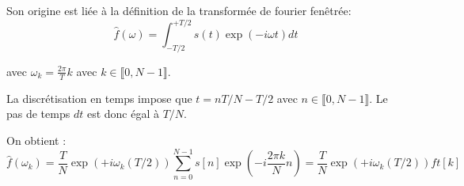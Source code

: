 \documentclass[a4paper, 12pt]{article}
\newcommand{\matlabscript}[2]
  {\begin{itemize}\item[]\end{itemize}}
\begin{document}
Son origine est liée à la définition de la transformée de fourier fenêtrée:
\begin{equation}
\hat{f}(\omega)=\int_{-T/2}^{+T/2} s(t) \exp \left(-i \omega t \right) dt
\end{equation}

avec $\omega_k=\frac{2 \pi}{T} k$ avec  $k \in  \llbracket  0, N-1 \rrbracket $.

La discrétisation en temps impose que $t=n T/N -T/2$ avec $n \in  \llbracket  0, N-1 \rrbracket $.
Le pas de temps $dt$ est donc égal à $T/N$.

On obtient :
\begin{equation}
\hat{f}(\omega_k)= \frac{T}{N} \exp \left(+i \omega_k (T/2) \right)  \sum_{n=0}^{N-1} s[n] \exp \left(-i \frac{2 \pi k}{N} n \right) =
\frac{T}{N} \exp \left(+i \omega_k (T/2) \right) ft [k]
\end{equation}

% 
% 
       
\end{document}

